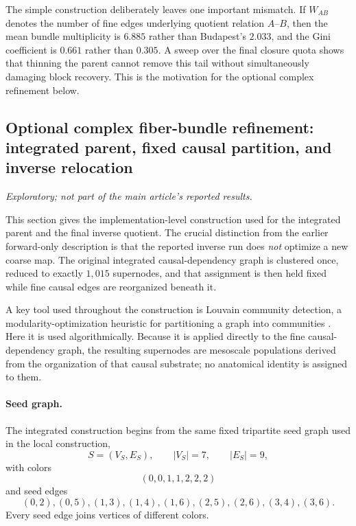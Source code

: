 \documentclass[12pt]{article}
\begin{document}
The simple construction deliberately leaves one important mismatch. If
$W_{AB}$ denotes the number of fine edges underlying quotient relation
$A$--$B$, then the mean bundle multiplicity is $6.885$ rather than Budapest's
$2.033$, and the Gini coefficient is $0.661$ rather than $0.305$. A sweep over
the final closure quota shows that thinning the parent cannot remove this tail
without simultaneously damaging block recovery. This is the motivation for
the optional complex refinement below.

\subsection{Optional complex fiber-bundle refinement: integrated parent, fixed causal partition, and inverse relocation}
\label{supp:global-methods}
\emph{Exploratory; not part of the main article's reported results.}

This section gives the implementation-level construction used for the
integrated parent and the final inverse quotient.  The crucial distinction
from the earlier forward-only description is that the reported inverse run
does \emph{not} optimize a new coarse map.  The original integrated
causal-dependency graph is clustered once, reduced to exactly \(1{,}015\)
supernodes, and that assignment is then held fixed while fine causal edges are
reorganized beneath it.

A key tool used throughout the construction is Louvain community detection,
a modularity-optimization heuristic for partitioning a graph into communities
\cite{Blondel2008}.  Here it is used algorithmically.  Because it is applied
directly to the fine causal-dependency graph, the resulting supernodes are
mesoscale populations derived from the organization of that causal substrate;
no anatomical identity is assigned to them.

\paragraph{Seed graph.}
The integrated construction begins from the same fixed tripartite seed graph
used in the local construction,
\[
S=(V_S,E_S),\qquad |V_S|=7,\qquad |E_S|=9,
\]
with colors
\[
(0,0,1,1,2,2,2)
\]
and seed edges
\[
(0,2),(0,5),(1,3),(1,4),(1,6),(2,5),(2,6),(3,4),(3,6).
\]
Every seed edge joins vertices of different colors.
\end{document}
